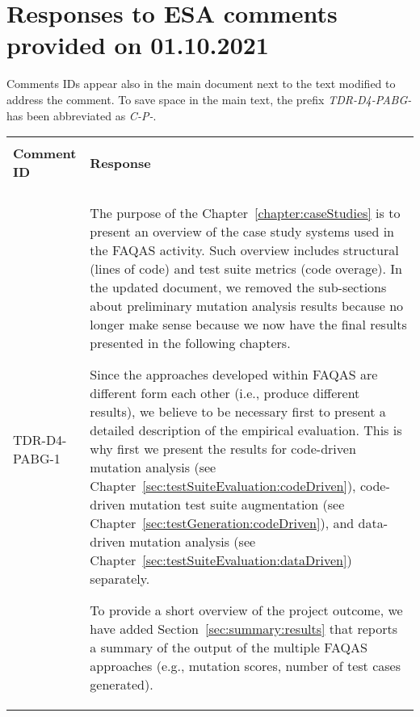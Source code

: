 
\section{Responses to ESA comments provided on 01.10.2021}
\label{sec:ESA:comments:1}

Comments IDs appear also in the main document next to the text modified to address the comment. To save space in the main text, the prefix \emph{TDR-D4-PABG-} has been abbreviated as \emph{C-P-}.

\setlength\LTleft{0pt}
\setlength\LTright{0pt}
\tiny
\begin{longtable}{|p{2cm}|p{12cm}|@{}}
\hline
\\
\textbf{Comment ID}&\textbf{Response}\\
\\
\hline
TDR-D4-PABG-1&
\begin{minipage}{12cm}
The purpose of the Chapter~\ref{chapter:caseStudies} is to present an overview of the case study systems used in the FAQAS activity. Such overview includes structural (lines of code) and test suite metrics (code overage). In the updated document, we removed the sub-sections about preliminary mutation analysis results because no longer make sense because we now have the final results presented in the following chapters.

Since the approaches developed within FAQAS are different form each other (i.e., produce different results), we believe to be necessary first to present a detailed description of the empirical evaluation. This is why first we present  the results for code-driven mutation analysis (see Chapter~\ref{sec:testSuiteEvaluation:codeDriven}), code-driven mutation test suite augmentation (see Chapter~\ref{sec:testGeneration:codeDriven}), and data-driven mutation analysis (see Chapter~\ref{sec:testSuiteEvaluation:dataDriven}) separately.

To provide a short overview of the project outcome, we have added Section~\ref{sec:summary:results} that reports a summary of the output of the multiple FAQAS approaches (e.g., mutation scores, number of test cases generated).


\end{minipage}
\end{longtable}
